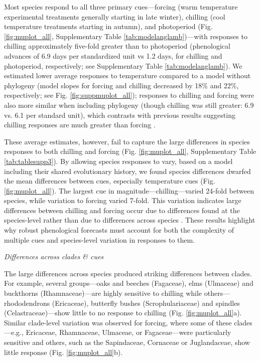 \documentclass[11pt]{article}
\begin{document}
\par Most species respond to all three primary cues---forcing (warm temperature experimental treatments generally starting in late winter), chilling (cool temperature treatments starting in autumn), and photoperiod (Fig. \ref{fig:muplot_all}, Supplementary Table \ref{tab:modelanglamb})---with responses to chilling approximately five-fold greater than to photoperiod (phenological advances of 6.9 days per standardized unit vs 1.2 days, for chilling and photoperiod, respectively; see Supplementary Table \ref{tab:modelanglamb}). We estimated lower average responses to temperature compared to a model without phylogeny (model slopes for forcing and chilling decreased by 18\% and 22\%, respectively; see Fig. \ref{fig:suppmuplot_all}); responses to chilling and forcing were also more similar when including phylogeny (though chilling was still greater: 6.9 vs. 6.1 per standard unit), which contrasts with previous results suggesting chilling responses are much greater than forcing  \citep{Laube:2014a,ettinger2020}. 

\par These average estimates, however, fail to capture the large differences in species responses to both chilling and forcing (Fig. \ref{fig:muplot_all}, Supplementary Table \ref{tab:tablesupp3}). By allowing species responses to vary, based on a model including their shared evolutionary history, we found species differences dwarfed the mean differences between cues, especially temperature cues (Fig. \ref{fig:muplot_all}). The largest cue in magnitude---chilling---varied 24-fold between species, while variation to forcing varied 7-fold. This variation indicates large differences between chilling and forcing occur due to differences found at the species-level rather than due to differences across species \citep[e.g., the average effect across species as previously suggested,][]{Laube:2014a,ettinger2020}. These results highlight why robust phenological forecasts must account for both the complexity of multiple cues and species-level variation in responses to them.

\emph{Differences across clades \& cues}

\par The large differences across species produced striking differences between clades. For example, several groups---oaks and
beeches (Fagaceae), elms (Ulmaceae) and buckthorns (Rhamnaceae)---are highly sensitive to chilling while others---rhododendrons (Ericaceae), butterfly bushes (Scrophulariaceae) and spindles (Celastraceae)---show little to no response to chilling  (Fig. \ref{fig:muplot_all}a). Similar clade-level variation was observed for forcing, where some of these clades---e.g., Ericaceae, Rhamnaceae, Ulmaceae, or Fagaceae---were particularly sensitive and others, such as the Sapindaceae, Cornaceae or Juglandaceae, show little response (Fig. \ref{fig:muplot_all}b). 
\end{document}
